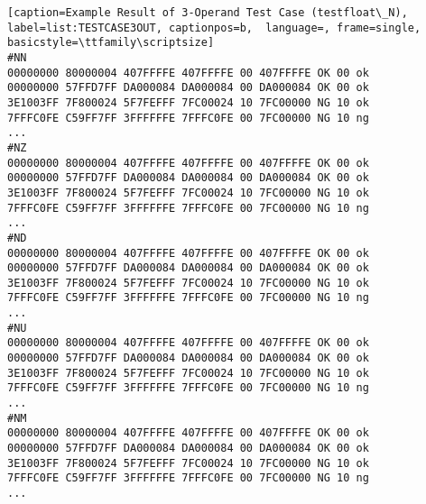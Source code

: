 \begin{lstlisting}[caption=Example Result of 3-Operand Test Case (testfloat\_N), label=list:TESTCASE3OUT, captionpos=b,  language=, frame=single, basicstyle=\ttfamily\scriptsize]
#NN
00000000 80000004 407FFFFE 407FFFFE 00 407FFFFE OK 00 ok
00000000 57FFD7FF DA000084 DA000084 00 DA000084 OK 00 ok
3E1003FF 7F800024 5F7FEFFF 7FC00024 10 7FC00000 NG 10 ok
7FFFC0FE C59FF7FF 3FFFFFFE 7FFFC0FE 00 7FC00000 NG 10 ng
...
#NZ
00000000 80000004 407FFFFE 407FFFFE 00 407FFFFE OK 00 ok
00000000 57FFD7FF DA000084 DA000084 00 DA000084 OK 00 ok
3E1003FF 7F800024 5F7FEFFF 7FC00024 10 7FC00000 NG 10 ok
7FFFC0FE C59FF7FF 3FFFFFFE 7FFFC0FE 00 7FC00000 NG 10 ng
...
#ND
00000000 80000004 407FFFFE 407FFFFE 00 407FFFFE OK 00 ok
00000000 57FFD7FF DA000084 DA000084 00 DA000084 OK 00 ok
3E1003FF 7F800024 5F7FEFFF 7FC00024 10 7FC00000 NG 10 ok
7FFFC0FE C59FF7FF 3FFFFFFE 7FFFC0FE 00 7FC00000 NG 10 ng
...
#NU
00000000 80000004 407FFFFE 407FFFFE 00 407FFFFE OK 00 ok
00000000 57FFD7FF DA000084 DA000084 00 DA000084 OK 00 ok
3E1003FF 7F800024 5F7FEFFF 7FC00024 10 7FC00000 NG 10 ok
7FFFC0FE C59FF7FF 3FFFFFFE 7FFFC0FE 00 7FC00000 NG 10 ng
...
#NM
00000000 80000004 407FFFFE 407FFFFE 00 407FFFFE OK 00 ok
00000000 57FFD7FF DA000084 DA000084 00 DA000084 OK 00 ok
3E1003FF 7F800024 5F7FEFFF 7FC00024 10 7FC00000 NG 10 ok
7FFFC0FE C59FF7FF 3FFFFFFE 7FFFC0FE 00 7FC00000 NG 10 ng
...
\end{lstlisting}



